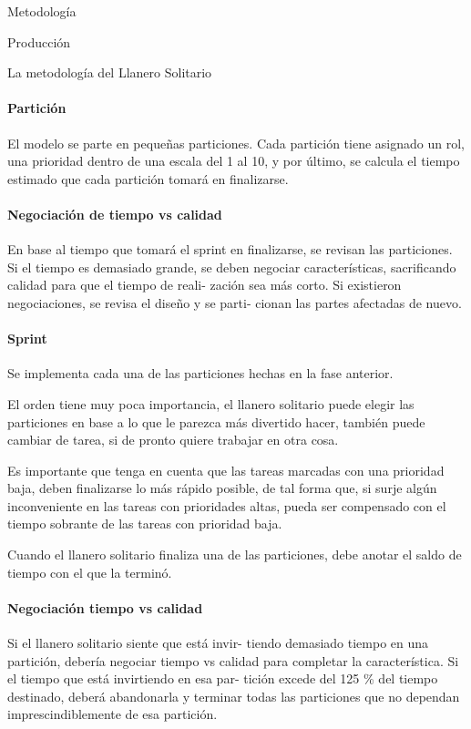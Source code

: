 \begin{section}{Metodología}
\begin{subsection}{Producción}
\begin{subsubsection}{La metodología del Llanero Solitario}
      \paragraph{Partición} El modelo se parte en pequeñas particiones. Cada partición tiene asignado un rol, una prioridad dentro de una escala del 1 al 10, y por último, se calcula el tiempo estimado que cada partición tomará en finalizarse.

      \paragraph{Negociación de tiempo vs calidad} En base al tiempo que tomará el sprint en finalizarse, se revisan las particiones. Si el tiempo es demasiado grande, se deben negociar características, sacrificando calidad para que el tiempo de reali- zación sea más corto. Si existieron negociaciones, se revisa el diseño y se parti- cionan las partes afectadas de nuevo.

      \paragraph{Sprint} Se implementa cada una de las particiones hechas en la fase anterior.

      El orden tiene muy poca importancia, el llanero solitario puede elegir las particiones en base a lo que le parezca más divertido hacer, también puede cambiar de tarea, si de pronto quiere trabajar en otra cosa.

      Es importante que tenga en cuenta que las tareas marcadas con una prioridad baja, deben finalizarse lo más rápido posible, de tal forma que, si surje algún inconveniente en las tareas con prioridades altas, pueda ser compensado con el tiempo sobrante de las tareas con prioridad baja.

      Cuando el llanero solitario finaliza una de las particiones, debe anotar el saldo de tiempo con el que la terminó.

      \paragraph{Negociación tiempo vs calidad} Si el llanero solitario siente que está invir- tiendo demasiado tiempo en una partición, debería negociar tiempo vs calidad para completar la característica. Si el tiempo que está invirtiendo en esa par- tición excede del 125 \% del tiempo destinado, deberá abandonarla y terminar todas las particiones que no dependan imprescindiblemente de esa partición.


\end{subsubsection}
\end{subsection}
\end{section}
